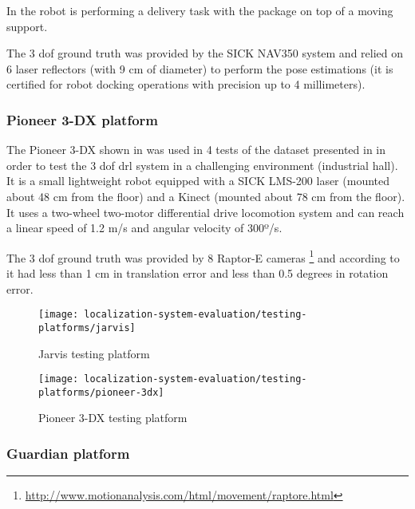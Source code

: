 In  the robot is performing a delivery task with the package on top of a moving support.

The 3 \gls{dof} ground truth was provided by the SICK NAV350 system and relied on 6 laser reflectors (with 9 cm of diameter) to perform the pose estimations (it is certified for robot docking operations with precision up to 4 millimeters).


\subsubsection{Pioneer 3-DX platform}

The Pioneer 3-DX shown in  was used in 4 tests of the dataset presented in \cite{Sturm2012} in order to test the 3 \gls{dof} \gls{drl} system in a challenging environment (industrial hall). It is a small lightweight robot equipped with a SICK LMS-200 laser (mounted about 48 cm from the floor) and a Kinect (mounted about 78 cm from the floor). It uses a two-wheel two-motor differential drive locomotion system and can reach a linear speed of 1.2 m/s and angular velocity of 300º/s.

The 3 \gls{dof} ground truth was provided by 8 Raptor-E cameras \footnote{\url{http://www.motionanalysis.com/html/movement/raptore.html}} and according to \cite{Sturm2012} it had less than 1 cm in translation error and less than 0.5 degrees in rotation error.

\begin{figure}[H]
	\centering
	\begin{minipage}[b]{0.24\textwidth}
		\centering
		\texttt{[image: localization-system-evaluation/testing-platforms/jarvis]}
		\caption{Jarvis testing platform}
		\label{fig:localization-system-evaluation_jarvis}
	\end{minipage}\hfill
	\begin{minipage}[b]{0.24\textwidth}
		\centering
		\texttt{[image: localization-system-evaluation/testing-platforms/pioneer-3dx]}
		\caption{Pioneer 3-DX testing platform \cite{Sturm2012}}
		\label{fig:localization-system-evaluation_pioneer}
	\end{minipage}
\end{figure}


\subsubsection{Guardian platform}

